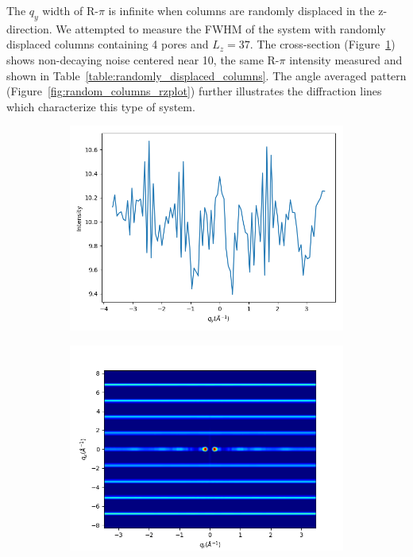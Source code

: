 \documentclass{article}
\begin{document}
  The $q_y$ width of R-$\pi$ is infinite when columns are randomly displaced in
  the z-direction. We attempted to measure the FWHM of the system with randomly
  displaced columns containing 4 pores and $L_z = 37$. The cross-section
  (Figure~\ref{fig:random_columns_qy}) shows non-decaying noise centered near 10,
  the same R-$\pi$ intensity measured and shown in
  Table~\ref{table:randomly_displaced_columns}. The angle averaged pattern
  (Figure~\ref{fig:random_columns_rzplot}) further illustrates the diffraction
  lines which characterize this type of system.

  \begin{figure}[!htb]
  \centering
  \begin{subfigure}{0.45\textwidth}
  \includegraphics[width=\textwidth]{random_columns_qy.png}
  \caption{}\label{fig:random_columns_qy}
  \end{subfigure}
  \begin{subfigure}{0.45\textwidth}
  \includegraphics[width=\textwidth]{random_columns_rzplot.png}

\end{subfigure}
\end{figure}
\end{document}
